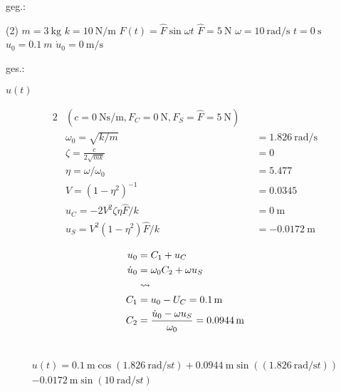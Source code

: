 \vspace{1em}

\begin{minipage}[t]{.49\linewidth}
geg.:
\begin{tasks}(2)
    \task[] $m = \SI{3}{\kilo\gram}$
    \task[] $k = \SI{10}{\newton\per\meter}$
    \task[] $F(t) = \hat{F} \sin{\omega t}$
    \task[] $\hat{F} = \SI{5}{\newton}$
    \task[] $\omega = \SI{10}{\radian\per\second}$
    \task[] $t=\SI{0}{\second}$
    \task[] $u_0 = \SI{0.1}{m}$
    \task[] $\dot{u}_0 = \SI{0}{\meter\per\second}$
\end{tasks}
\end{minipage}
\begin{minipage}[t]{.49\linewidth}
ges.:
\begin{tasks}
    \task $u(t)$
\end{tasks}
\end{minipage}

\begin{solution}
    \begin{alignat*}{2}
        &(c = \SI{0}{\newton\second\per\meter}, F_C = \SI{0}{\newton}, F_S = \hat{F} = \SI{5}{\newton})\\
        &\omega_0 = \sqrt{k/m} &&= \SI{1.826}{\radian\per\second} \\
        &\zeta = \frac{c}{2\sqrt{mk}} &&= 0 \\
        &\eta = \omega/\omega_0 &&= 5.477\\
        &V = (1-\eta^2)^{-1} &&=  0.0345 \\
        &u_C = -2V^2\zeta\eta\hat{F}/k &&= \SI{0}{\meter} \\
        &u_S = V^2(1-\eta^2)\hat{F}/k &&= \SI{-0.0172}{\meter}
    \end{alignat*}

    \begin{align*}
        u_0 &= C_1 + u_C \\
        \dot{u}_0 &= \omega_0 C_2+\omega u_S\\
        &\rightsquigarrow \\
        C_1 &=  u_0 - U_C = \SI{0.1}{\meter}\\
        C_2 &= \frac{\dot{u}_0 - \omega u_S}{\omega_0} = \SI{0.0944}{\meter} \\
        \vspace{1cm}
    \end{align*}

    \begin{equation*}
        \begin{split}
            u(t) = \SI{0.1}{\meter} \cos{(\SI{1.826}{\radian\per\second} t)} +\SI{0.0944}{\meter} \sin{((\SI{1.826}{\radian\per\second} t))} \\ - \SI{0.0172}{\meter}\sin{(\SI{10}{\radian\per\second} t)}
        \end{split}
    \end{equation*}
\end{solution}
    
